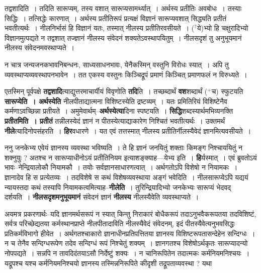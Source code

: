 \documentclass[article,12pt,a4paper]{memoir}
\newcommand{\unclear}[1]{($^{?}$#1)}
\newcommand{\add}[1]{($^{+}$#1)}
\begin{document}
	  \pstart तद्वशादिति । तदिति सारूप्यम्, तस्य वशात् सारूप्यसामर्थ्यात् । अर्थस्य प्रतीतिः अवबोधः । तस्याः सिद्धिः । तत्सिद्धेः कारणात् । अर्थस्य प्रतीतिरूपं प्रत्यक्षं विज्ञानं सारूप्यवशात् सिद्ध्यति प्रतीतं भवतीत्यर्थः । नीलनिर्भासं हि विज्ञानं यतः, तस्मात् नीलस्य प्रतीतिरवसीयते । \unclear{ये}भ्यो हि चक्षुरादिभ्यो विज्ञानमुत्पद्यते न तद्वशात् तज्ज्ञानं नीलस्य संवेदनं शक्यतेऽवस्थापयितुम् । नीलसदृशं तु अनुभूयमानं नीलस्य संवेदनमवस्थाप्यते ।
	\pend
        

	  \pstart न चात्र जन्यजनकभावनिबन्धनः, साध्यसाधनभावः, येनैकस्मिन् वस्तुनि विरोधः स्यात् । अपि तु व्यवस्थाप्यव्यवस्थापनभावेन । तत एकस्य वस्तुनः किञ्चिद्रूपं प्रमाणं किञ्चित् प्रमाणफलं न विरुध्यते ।
	\pend
      
	  \endgroup
	

	  \pstart एतस्मिन् पूर्वपक्षे \textbf{तद्वशादि}त्याद्युत्तरमाचार्यीयं विवृणोति \textbf{तदि}ति । तच्छब्दार्थं \textbf{वश}शब्दार्थं \add{च} स्फुटयति \textbf{सारूप्येति । अर्थस्येति} नीलपीताद्यात्मना विशिष्टस्येति द्रष्टव्यम् । यतः प्रमितिरियं विशिष्टेनैव कर्मणाऽवच्छिन्ना प्रतीयते । अमुमेवार्थम्--\textbf{अर्थस्येत्या}दिना स्पष्टयति । \textbf{सिद्धि}शब्दस्यार्थमभिव्यनक्ति \textbf{प्रतीतमिति । प्रतीतं} तन्नीलस्येदं ज्ञानं न पीतस्येत्याद्याकारेण निश्चितं भवतीत्यर्थः । उक्तमर्थं \textbf{नीले}त्यादिनोपसंहरति । \textbf{हिर}वधारणे । यत एवं तत्तस्मात् नीलस्य प्रतीतिर्नीलस्यैवेदं ज्ञानमित्यवसीयते ।
	\pend
      

	  \pstart ननु जनकेभ्य एवेयं ज्ञानस्य व्यवस्था भविष्यति । ते हि ज्ञानं जनयितुं शक्ताः किमङ्ग निश्चाययितुं न शक्नुयुः ? अतश्च न सारूप्याधीनोऽयं प्रतीतिनियम इत्याशङ्क्याह—येभ्य इति । \textbf{हि}र्यस्मात् । एवं ब्रुवतोऽयं भावः--नेन्द्रियालोकौ नियामकौ । तयोः सर्वज्ञानसाधारणत्वात् । अर्थगतोऽपि विशेषो न नियामकः । ज्ञानादेव हि स प्रत्येतव्यः । तदविशेषे स कथं विशेषव्यवस्थाया अङ्गं भवेदिति । नीलसारूप्येऽपि यद्ययं न्यायस्तदा कथं तस्यापि नियामकत्वमित्याह--\textbf{नीलेति} । तुरिन्द्रियादिभ्यो जनकेभ्यः सारूप्यं भेदवद् दर्शयति । \textbf{नीलसदृशमनुभूयमानं} संवेदनं ज्ञानं \textbf{नीलस्य} नीलस्यैवेति व्यवस्थाप्यते ।
	\pend
      

	  \pstart अयमत्र प्रकरणार्थः--यदि ज्ञानमर्थसरूपं न स्यात् किन्तु निराकारं बोधैकरूपं तदाऽनुभवैकरूपतया तदविशिष्टं, सर्वत्र परिच्छेद्यतया कर्मस्थानप्राप्ते नीलपीतादाविति नीलस्यैवेदं संवेदनम्, इदं पीतस्यैवेत्यनुभवसिद्धः प्रतिकर्मविभागो हीयेत । \leavevmode{}अर्थगतश्चाकारो ज्ञानाधीनप्रतिपत्तितया ज्ञानस्य विशिष्टरूपतासन्देहेन सन्दिग्धः । न च तेनैव सन्दिग्धरूपेण तदेव सन्दिग्धं रूपं निश्चेतुं शक्यम् । ज्ञानगतश्च विशेषोऽर्थकृतः सारूप्यादन्यो नोपपद्यते । सन्नपि न तावदिदंतयाऽसौ निर्देष्टुं शक्यः । न चानिरूपितेन तदात्मकः कर्मनियमनिश्चयः । यद्रूपश्च यश्च कर्मनियमनिश्चयो ज्ञानस्य तस्मिन्ननिरूपिते कीदृशी तद्रूपताव्यवस्था ? यथा  \leavevmode{} 
	  
\end{document}

